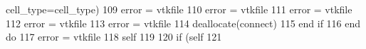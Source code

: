\begin{DoxyCode}
      cell\_type=cell\_type)
109             error = vtkfile%
110             error = vtkfile%
111             error = vtkfile%
112             error = vtkfile%
113             error = vtkfile%
114             \textcolor{keyword}{deallocate}(connect)
115 \textcolor{keywordflow}{        end if}
116 \textcolor{keywordflow}{    end do}
117     error = vtkfile%
118     self%
119     
120     \textcolor{keywordflow}{if} (self%
121 
\end{DoxyCode}
